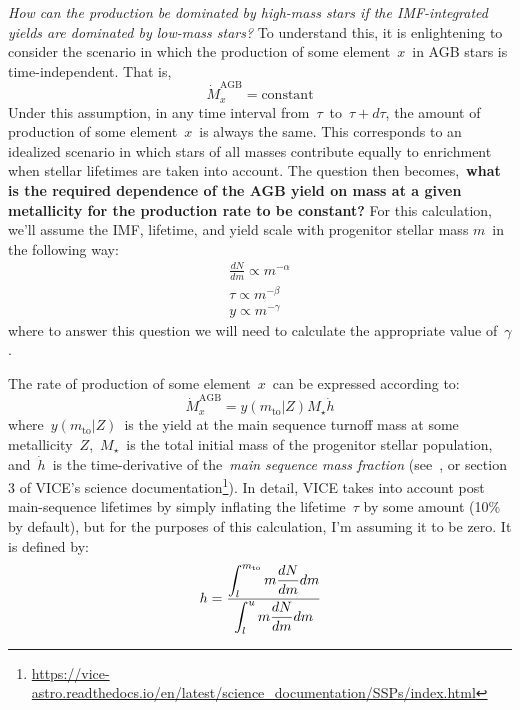 \documentclass[\main/notes.tex]{subfiles}
\begin{document}
\twolineskip 
{\Large \textit{How can the production be dominated by high-mass stars if the 
IMF-integrated yields are dominated by low-mass stars?}} 
To understand this, it is enlightening to consider the scenario in which the 
production of some element~$x$~in AGB stars is time-independent. That is, 
\begin{equation} 
\dot{M}_x^\text{AGB} = \text{constant} 
\end{equation} 
Under this assumption, in any time interval from~$\tau$~to~$\tau + d\tau$, the 
amount of production of some element~$x$~is always the same. This corresponds 
to an idealized scenario in which stars of all masses contribute equally to 
enrichment when stellar lifetimes are taken into account. The question then 
becomes,~\textbf{what is the required dependence of the AGB yield on mass at a 
given metallicity for the production rate to be constant?} For this calculation, 
we'll assume the IMF, lifetime, and yield scale with progenitor stellar mass 
$m$~in the following way: 
\begin{subequations}\begin{align} 
\frac{dN}{dm} \propto m^{-\alpha} \\ 
\tau \propto m^{-\beta} \\ 
y \propto m^{-\gamma} 
\end{align}\end{subequations} 
where to answer this question we will need to calculate the appropriate value 
of~$\gamma$. 
\par 
The rate of production of some element~$x$~can be expressed according to: 
\begin{equation} 
\dot{M}_x^\text{AGB} = y(m_\text{to}|Z) M_\star \dot{h} 
\end{equation} 
where~$y(m_\text{to}|Z)$~is the yield at the main sequence turnoff mass at some 
metallicity~$Z$,~$M_\star$~is the total initial mass of the progenitor stellar 
population, and~$\dot{h}$~is the time-derivative of the~\textit{main sequence 
mass fraction} (see~\citet{Johnson2020}, or section 3 of VICE's science 
documentation\footnote{
	\url{https://vice-astro.readthedocs.io/en/latest/science_documentation/SSPs/index.html}
}). In detail, VICE takes into account post main-sequence lifetimes by simply 
inflating the lifetime~$\tau$ by some amount (10\% by default), but for the 
purposes of this calculation, I'm assuming it to be zero. It is defined by: 
\begin{equation} 
h = \frac{\displaystyle 
	\int_l^{m_\text{to}} m \frac{dN}{dm} dm 
}{\displaystyle 
	\int_l^u m \frac{dN}{dm} dm 
}
\end{equation} 
\end{document}
